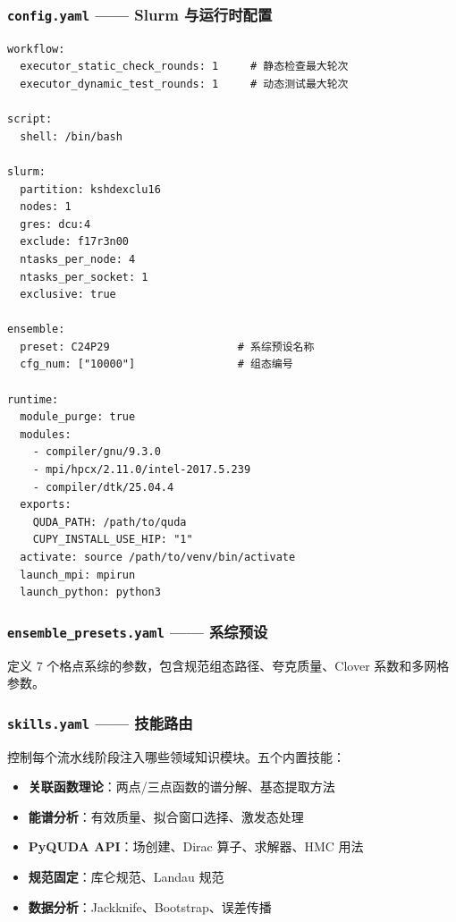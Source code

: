 \documentclass[12pt,a4paper]{ctexart}
\begin{document}
\subsubsection{\texttt{config.yaml} —— Slurm 与运行时配置}

\begin{lstlisting}[style=yamlcode]
workflow:
  executor_static_check_rounds: 1     # 静态检查最大轮次
  executor_dynamic_test_rounds: 1     # 动态测试最大轮次

script:
  shell: /bin/bash

slurm:
  partition: kshdexclu16
  nodes: 1
  gres: dcu:4
  exclude: f17r3n00
  ntasks_per_node: 4
  ntasks_per_socket: 1
  exclusive: true

ensemble:
  preset: C24P29                    # 系综预设名称
  cfg_num: ["10000"]                # 组态编号

runtime:
  module_purge: true
  modules:
    - compiler/gnu/9.3.0
    - mpi/hpcx/2.11.0/intel-2017.5.239
    - compiler/dtk/25.04.4
  exports:
    QUDA_PATH: /path/to/quda
    CUPY_INSTALL_USE_HIP: "1"
  activate: source /path/to/venv/bin/activate
  launch_mpi: mpirun
  launch_python: python3
\end{lstlisting}

\subsubsection{\texttt{ensemble\_presets.yaml} —— 系综预设}

定义 7 个格点系综的参数，包含规范组态路径、夸克质量、Clover 系数和多网格参数。

\subsubsection{\texttt{skills.yaml} —— 技能路由}

控制每个流水线阶段注入哪些领域知识模块。五个内置技能：
\begin{itemize}[itemsep=2pt]
    \item \textbf{关联函数理论}：两点/三点函数的谱分解、基态提取方法
    \item \textbf{能谱分析}：有效质量、拟合窗口选择、激发态处理
    \item \textbf{PyQUDA API}：场创建、Dirac 算子、求解器、HMC 用法
    \item \textbf{规范固定}：库仑规范、Landau 规范
    \item \textbf{数据分析}：Jackknife、Bootstrap、误差传播
\end{itemize}
\end{document}
